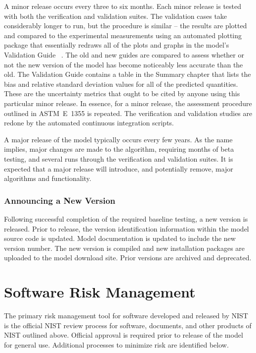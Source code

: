 \documentclass[11pt]{book}
\begin{document}
A minor release occurs every three to six months. Each minor release is tested with both the verification and validation suites. The validation cases take considerably longer to run, but the procedure is similar -- the results are plotted and compared to the experimental measurements using an automated plotting package that essentially redraws all of the plots and graphs in the model's Validation Guide~\cite{FDS_Validation_Guide} \cite{CFAST_Valid_Guide_7}. The old and new guides are compared to assess whether or not the new version of the model has become noticeably less accurate than the old. The Validation Guide contains a table in the Summary chapter that lists the bias and relative standard deviation values for all of the predicted quantities. These are the uncertainty metrics that ought to be cited by anyone using this particular minor release. In essence, for a minor release, the assessment procedure outlined in ASTM~E~1355 is repeated. The verification and validation studies are redone by the automated continuous integration scripts.

A major release of the model typically occurs every few years. As the name implies, major changes are made to the algorithm, requiring months of beta testing, and several runs through the verification and validation suites. It is expected that a major release will introduce, and potentially remove, major algorithms and functionality.


\subsection{Announcing a New Version}

Following successful completion of the required baseline testing, a new version is released.  Prior to release, the version identification information within the model source code is updated.  Model documentation is updated to include the new version number.  The new version is compiled and new installation packages are uploaded to the model download site.  Prior versions are archived and deprecated.



\chapter{Software Risk Management}

The primary risk management tool for software developed and released by NIST is the official NIST review process for software, documents, and other products of NIST outlined above. Official approval is required prior to release of the model for general use. Additional processes to minimize risk are identified below.
\end{document}
